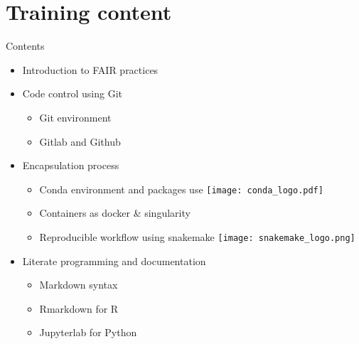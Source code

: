 \section{Training content}
\begin{frame}
\begin{block}{Contents}
\begin{itemize}
\item<1-> Introduction to FAIR practices
\item<2-> Code control using Git \faGit* 
	\begin{itemize}[<2->]
	\item Git environment
	\item Gitlab and Github \faGithub \faGitlab
	\end{itemize}
\item<3-> Encapsulation process
	\begin{itemize}[<3->]
	\item Conda environment and packages use \texttt{[image: conda\_logo.pdf]}
	\item Containers as docker \& singularity \faDocker 
	\item Reproducible workflow using snakemake 	\texttt{[image: snakemake\_logo.png]}
	\end{itemize}
\item<4-> Literate programming and documentation
	\begin{itemize}[<4->]
	\item Markdown syntax \faMarkdown
	\item Rmarkdown for R \faRProject 
	\item Jupyterlab for Python \faPython
	\end{itemize}
\end{itemize}
\end{block}
\end{frame}